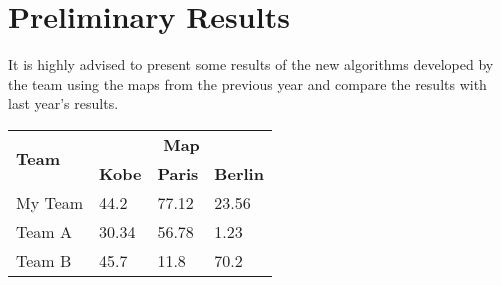 \documentclass[runningheads,a4paper]{llncs}
\begin{document}
\section{Preliminary Results}
It is highly advised to present some results of the new algorithms developed by 
the team using the maps from the previous year and compare the results with 
last year's results.
\begin{table}
\begin{tabular}{llll}
	\hline
	\multirow{2}{*}{\textbf{Team}}	& \multicolumn{3}{c}{\textbf{Map}}\\
	\cline{2-4}
									& \textbf{Kobe} & \textbf{Paris} & 
									\textbf{Berlin}\\
	\hline
	My Team					& 44.2	& 77.12	& 23.56\\
	Team A					& 30.34	& 56.78	& 1.23\\
	Team B					& 45.7	& 11.8	& 70.2\\
	\hline
\end{tabular}
\end{table}


\end{document}
